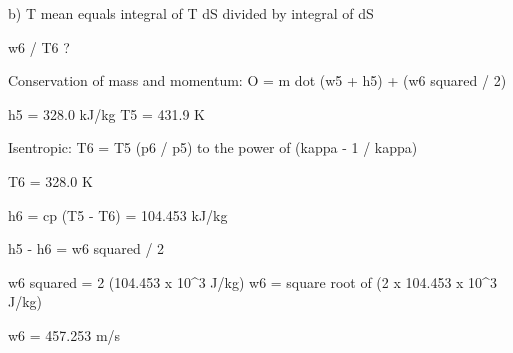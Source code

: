 b) T mean equals integral of T dS divided by integral of dS

w6 / T6 ?  

Conservation of mass and momentum:  
O = m dot (w5 + h5) + (w6 squared / 2)  

h5 = 328.0 kJ/kg  
T5 = 431.9 K  

Isentropic:  
T6 = T5 (p6 / p5) to the power of (kappa - 1 / kappa)  

T6 = 328.0 K  

h6 = cp (T5 - T6) = 104.453 kJ/kg  

h5 - h6 = w6 squared / 2  

w6 squared = 2 (104.453 x 10^3 J/kg)  
w6 = square root of (2 x 104.453 x 10^3 J/kg)  

w6 = 457.253 m/s
